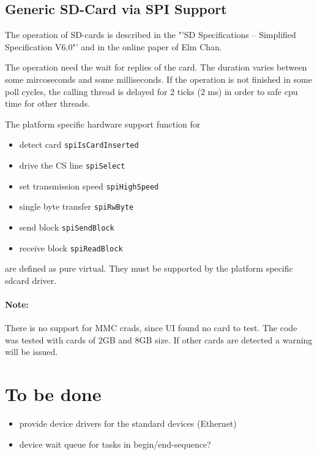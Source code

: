 \subsection{Generic SD-Card via SPI Support}
\label{sec:SDCardSpi}
The operation of SD-cards is described in the "'SD Specifications -- 
Simplified Specification V6.0"' and in the online paper of
Elm Chan.

The operation need the wait for replies of the card. The duration
varies between some mircoseconds and some milliseconds. If the 
operation is not finished in some poll cycles, the calling thread 
is delayed for 2 ticks (2 ms) in order to safe cpu time for other threads.

The platform specific hardware support function for
\begin{itemize}
\item detect card \verb|spiIsCardInserted|
\item drive the CS line \verb|spiSelect|
\item set transmission speed \verb|spiHighSpeed|
\item single byte transfer \verb|spiRwByte|
\item send block \verb|spiSendBlock|
\item receive block \verb|spiReadBlock|
\end{itemize}
are defined as pure virtual. They must be supported by the platform specific 
sdcard driver.


\paragraph{Note:} There is no support for MMC crads, since UI found no card
to test. The code was tested with cards of 2GB and 8GB size.
If other cards are detected a warning will be issued.

\section{To be done}
  \begin{itemize}
  \item provide device drivers for the standard devices (Ethernet)
  \item device wait queue for tasks in begin/end-sequence?
  \end{itemize}


